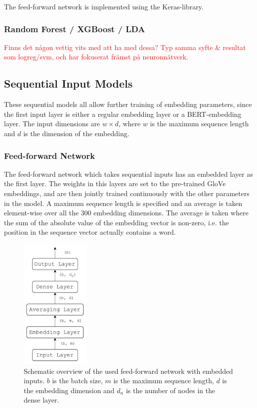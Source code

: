The feed-forward network is implemented using the Keras-library. 


\subsubsection*{Random Forest / XGBoost / LDA}
\textcolor{red}{Finns det någon vettig vits med att ha med dessa? Typ samma syfte \& resultat som logreg/svm, och har fokuserat främst på neuronnätverk. }


\subsection{Sequential Input Models}

These sequential models all allow further training of embedding parameters, since the first input layer is either a regular embedding layer or a BERT-embedding layer. The input dimensions are $w \times d$, where $w$ is the maximum sequence length and $d$ is the dimension of the embedding. 

\subsubsection*{Feed-forward Network}

The feed-forward network which takes sequential inputs has an embedded layer as the first layer. The weights in this layers are set to the pre-trained GloVe embeddings, and are then jointly trained continuously with the other parameters in the model. A maximum sequence length is specified and an average is taken element-wise over all the 300 embedding dimensions. The average is taken where the sum of the absolute value of the embedding vector is non-zero, i.e. the position in the sequence vector actually contains a word.

\begin{figure}[H]
    \centering
    \includegraphics[width=0.3\textwidth]{Figures/figs-ff_emb.pdf}
    \caption{Schematic overview of the used feed-forward network with embedded inputs. $b$ is the batch size, $m$ is the maximum sequence length, $d$ is the embedding dimension and $d_n$ is the number of nodes in the dense layer.}
\end{figure}

